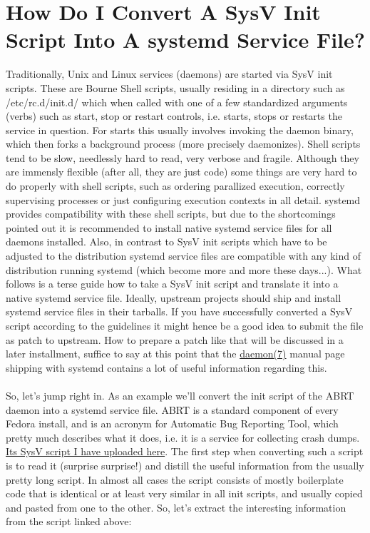 \documentclass[titlepage]{article}
\begin{document}
\section{How Do I Convert A SysV Init Script Into A systemd Service File?}
Traditionally, Unix and Linux services (daemons) are started via SysV init scripts. These are Bourne Shell scripts, usually residing in a directory such as /etc/rc.d/init.d/ which when called with one of a few standardized arguments (verbs) such as start, stop or restart controls, i.e. starts, stops or restarts the service in question. For starts this usually involves invoking the daemon binary, which then forks a background process (more precisely daemonizes). Shell scripts tend to be slow, needlessly hard to read, very verbose and fragile. Although they are immensly flexible (after all, they are just code) some things are very hard to do properly with shell scripts, such as ordering parallized execution, correctly supervising processes or just configuring execution contexts in all detail. systemd provides compatibility with these shell scripts, but due to the shortcomings pointed out it is recommended to install native systemd service files for all daemons installed. Also, in contrast to SysV init scripts which have to be adjusted to the distribution systemd service files are compatible with any kind of distribution running systemd (which become more and more these days...). What follows is a terse guide how to take a SysV init script and translate it into a native systemd service file. Ideally, upstream projects should ship and install systemd service files in their tarballs. If you have successfully converted a SysV script according to the guidelines it might hence be a good idea to submit the file as patch to upstream. How to prepare a patch like that will be discussed in a later installment, suffice to say at this point that the \href{https://0pointer.de/public/systemd-man/daemon.html}{daemon(7)} manual page shipping with systemd contains a lot of useful information regarding this.
\\
\\
So, let's jump right in. As an example we'll convert the init script of the ABRT daemon into a systemd service file. ABRT is a standard component of every Fedora install, and is an acronym for Automatic Bug Reporting Tool, which pretty much describes what it does, i.e. it is a service for collecting crash dumps. \href{https://0pointer.de/public/abrtd}{Its SysV script I have uploaded here}.
\newpage
The first step when converting such a script is to read it (surprise surprise!) and distill the useful information from the usually pretty long script. In almost all cases the script consists of mostly boilerplate code that is identical or at least very similar in all init scripts, and usually copied and pasted from one to the other. So, let's extract the interesting information from the script linked above:
\end{document}
